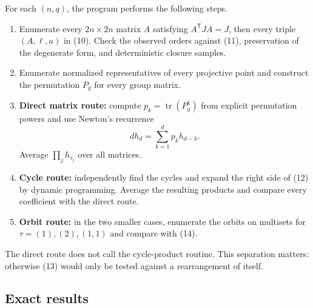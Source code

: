 \documentclass[10pt]{article}
\begin{document}
For each $(n,q)$, the program performs the following steps.
\begin{enumerate}[leftmargin=*,itemsep=3pt]
\item Enumerate every $2n\times2n$ matrix $A$ satisfying
$A^{\mathsf T}JA=J$, then every triple $(A,\ell,a)$ in (10). Check the observed
orders against (11), preservation of the degenerate form, and deterministic
closure samples.
\item Enumerate normalized representatives of every projective point and
construct the permutation $P_g$ for every group matrix.
\item \textbf{Direct matrix route:} compute $p_k=\operatorname{tr}(P_g^k)$
from explicit permutation powers and use Newton's recurrence
\[
 d h_d=\sum_{k=1}^d p_kh_{d-k}.
\]
Average $\prod_jh_{\tau_j}$ over all matrices.
\item \textbf{Cycle route:} independently find the cycles and expand the
right side of (12) by dynamic programming. Average the resulting products and
compare every coefficient with the direct route.
\item \textbf{Orbit route:} in the two smaller cases, enumerate the orbits on
multisets for $\tau=(1),(2),(1,1)$ and compare with (14).
\end{enumerate}

The direct route does not call the cycle-product routine. This separation
matters: otherwise (13) would only be tested against a rearrangement of itself.

\subsection{Exact results}
\end{document}
